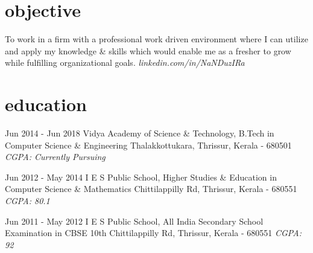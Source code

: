 \documentclass[]{friggeri-cv}
\begin{document}
		
\newline

\section{objective}
\begin{entrylist}

	\entry
	{}
    {{\normalfont To work in a firm with a professional work driven environment where I can utilize and apply my knowledge \& skills which would enable me as a fresher to grow while fulfilling organizational goals.}}
    {\emph{linkedin.com/in/NaNDuzIRa}}
	{}
\end{entrylist}
\newline

\section{education}
\begin{entrylist}
	
	\entry
	{Jun 2014 - Jun 2018}
	{Vidya Academy of Science \& Technology, {\normalfont B.Tech in Computer Science \& Engineering \newline}}
	{Thalakkottukara, Thrissur, Kerala - 680501}
	{\emph{CGPA: Currently Pursuing}}
	  
	
	\entry
	{Jun 2012 - May 2014}
	{I E S Public School, {\normalfont Higher Studies \& Education in Computer Science \& Mathematics \newline}}
	{Chittilappilly Rd, Thrissur, Kerala - 680551}
	{\emph{CGPA: 80.1}}
    
    
	\entry
	{Jun 2011 - May 2012}
	{I E S Public School, {\normalfont All India Secondary School Examination in CBSE 10th \newline }}
	{Chittilappilly Rd, Thrissur, Kerala - 680551}
	{\emph{CGPA: 92}}
	  
\end{entrylist}
\newline
\end{document}
